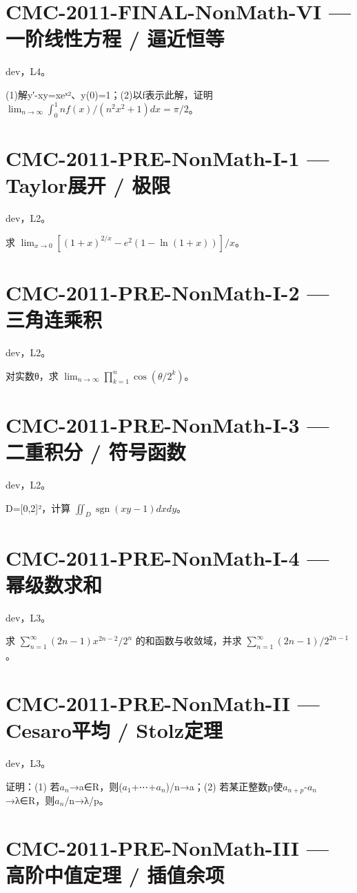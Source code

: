 \documentclass[UTF8]{ctexart}
\begin{document}
\section*{CMC-2011-FINAL-NonMath-VI — 一阶线性方程 / 逼近恒等}

dev，L4。

(1)解y′-xy=xeˣ²、y(0)=1；(2)以f表示此解，证明 $\lim_{n\to\infty}\int_0^1 nf(x)/(n^2x^2+1)dx=\pi/2$。

\section*{CMC-2011-PRE-NonMath-I-1 — Taylor展开 / 极限}

dev，L2。

求 $\lim_{x\to0}[(1+x)^{2/x}-e^2(1-\ln(1+x))]/x$。

\section*{CMC-2011-PRE-NonMath-I-2 — 三角连乘积}

dev，L2。

对实数θ，求 $\lim_{n\to\infty}\prod_{k=1}^n\cos(\theta/2^k)$。

\section*{CMC-2011-PRE-NonMath-I-3 — 二重积分 / 符号函数}

dev，L2。

D=[0,2]²，计算 $\iint_D\operatorname{sgn}(xy-1)dxdy$。

\section*{CMC-2011-PRE-NonMath-I-4 — 幂级数求和}

dev，L3。

求 $\sum_{n=1}^\infty(2n-1)x^{2n-2}/2^n$ 的和函数与收敛域，并求 $\sum_{n=1}^\infty(2n-1)/2^{2n-1}$。

\section*{CMC-2011-PRE-NonMath-II — Cesaro平均 / Stolz定理}

dev，L3。

证明：(1) 若$a_n$→a∈R，则($a_1$+⋯+$a_n$)/n→a；(2) 若某正整数p使$a_{n+p}$-$a_n$→λ∈R，则$a_n$/n→λ/p。

\section*{CMC-2011-PRE-NonMath-III — 高阶中值定理 / 插值余项}
\end{document}
